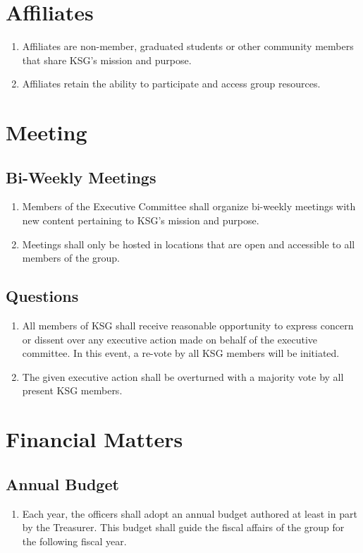 \documentclass[12pt,executivepaper]{article}
\begin{document}
\section{Affiliates}
\begin{enumerate}
    \item Affiliates are non-member, graduated students or other community members
          that share KSG's mission and purpose.
    \item Affiliates retain the ability to participate and access group resources.
\end{enumerate}

\section{Meeting}

\subsection{Bi-Weekly Meetings}
\begin{enumerate}
    \item Members of the Executive Committee shall organize bi-weekly meetings with
          new content pertaining to KSG's mission and purpose.
    \item Meetings shall only be hosted in locations that are open and accessible
          to all members of the group.
\end{enumerate}

\subsection{Questions}
\begin{enumerate}
    \item All members of KSG shall receive reasonable opportunity to express concern
          or dissent over any executive action made on behalf of the executive committee.
          In this event, a re-vote by all KSG members will be initiated.
    \item The given executive action shall be overturned with a majority vote by
          all present KSG members.
\end{enumerate}

\section{Financial Matters}

\subsection{Annual Budget}
\begin{enumerate}
    \item Each year, the officers shall adopt an annual budget authored at least in
          part by the Treasurer. This budget shall guide the fiscal affairs of the
          group for the following fiscal year.
\end{enumerate}
\end{document}
